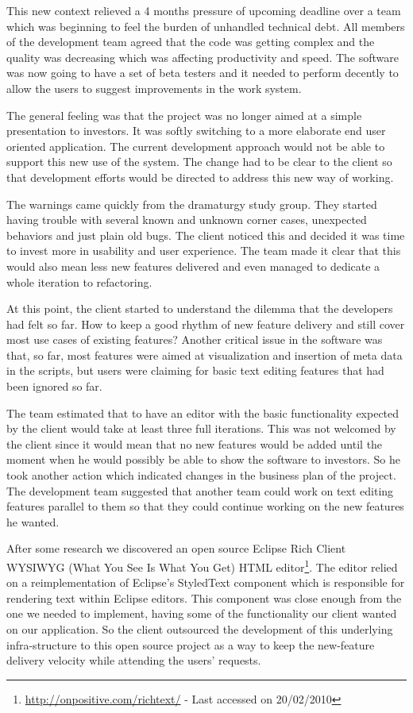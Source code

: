 \documentclass[lnbip]{svmultln}
\begin{document}
This new context relieved a 4 months pressure of upcoming deadline
over a team which was beginning to feel the burden of unhandled
technical debt. All members of the development team agreed that the
code was getting complex and the quality was decreasing which was
affecting productivity and speed. The software was now going to have a
set of beta testers and it needed to perform decently to allow the
users to suggest improvements in the work system.

The general feeling was that the project was no longer aimed at a
simple presentation to investors. It was softly switching to a more
elaborate end user oriented application. The current development
approach would not be able to support this new use of the system. The
change had to be clear to the client so that development efforts would
be directed to address this new way of working.

The warnings came quickly from the dramaturgy study group. They started having
trouble with several known and unknown corner cases, unexpected behaviors and
just plain old bugs. The client noticed this and decided it was time to invest
more in usability and user experience. The team made it clear that this would
also mean less new features delivered and even managed to dedicate a whole
iteration to refactoring.

At this point, the client started to understand the dilemma that the
developers had felt so far. How to keep a good rhythm of new feature delivery
and still cover most use cases of existing features? Another critical
issue in the software was that, so far, most features were aimed at
visualization and insertion of meta data in the scripts, but users
were claiming for basic text editing features that had been ignored so far.

The team estimated that to have an editor with the basic functionality expected
by the client would take at least three full iterations. This was not welcomed
by the client since it would mean that no new features would be added until the
moment when he would possibly be able to show the software to investors. So he
took another action which indicated changes in the business plan of the project.
The development team suggested that another team could work on text editing
features parallel to them so that they could continue working on the new
features he wanted.

After some research we discovered an open source Eclipse Rich Client WYSIWYG
(What You See Is What You Get) HTML
editor\footnote{\url{http://onpositive.com/richtext/} - Last accessed on
20/02/2010}. The editor relied on a reimplementation of Eclipse's StyledText
component which is responsible for rendering text within Eclipse editors. This
component was close enough from the one we needed to implement, having some of
the functionality our client wanted on our application. So the client outsourced
the development of this underlying infra-structure to this open source project
as a way to keep the new-feature delivery velocity while attending the users'
requests.
\end{document}
